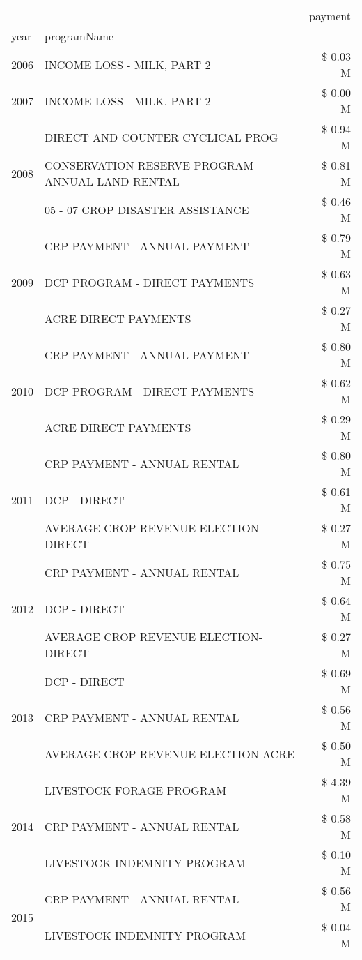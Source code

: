 \begin{tabular}{llr}
\toprule
 &  & payment \\
year & programName &  \\
\midrule
2006 & INCOME LOSS - MILK, PART 2 & \$ 0.03 M \\
\cline{1-3}
2007 & INCOME LOSS - MILK, PART 2 & \$ 0.00 M \\
\cline{1-3}
\multirow[t]{3}{*}{2008} & DIRECT AND COUNTER CYCLICAL PROG & \$ 0.94 M \\
 & CONSERVATION RESERVE PROGRAM - ANNUAL LAND RENTAL & \$ 0.81 M \\
 & 05 - 07 CROP DISASTER ASSISTANCE & \$ 0.46 M \\
\cline{1-3}
\multirow[t]{3}{*}{2009} & CRP PAYMENT - ANNUAL PAYMENT & \$ 0.79 M \\
 & DCP PROGRAM - DIRECT PAYMENTS & \$ 0.63 M \\
 & ACRE DIRECT PAYMENTS & \$ 0.27 M \\
\cline{1-3}
\multirow[t]{3}{*}{2010} & CRP PAYMENT - ANNUAL PAYMENT & \$ 0.80 M \\
 & DCP PROGRAM - DIRECT PAYMENTS & \$ 0.62 M \\
 & ACRE DIRECT PAYMENTS & \$ 0.29 M \\
\cline{1-3}
\multirow[t]{3}{*}{2011} & CRP PAYMENT - ANNUAL RENTAL & \$ 0.80 M \\
 & DCP - DIRECT & \$ 0.61 M \\
 & AVERAGE CROP REVENUE ELECTION-DIRECT & \$ 0.27 M \\
\cline{1-3}
\multirow[t]{3}{*}{2012} & CRP PAYMENT - ANNUAL RENTAL & \$ 0.75 M \\
 & DCP - DIRECT & \$ 0.64 M \\
 & AVERAGE CROP REVENUE ELECTION-DIRECT & \$ 0.27 M \\
\cline{1-3}
\multirow[t]{3}{*}{2013} & DCP - DIRECT & \$ 0.69 M \\
 & CRP PAYMENT - ANNUAL RENTAL & \$ 0.56 M \\
 & AVERAGE CROP REVENUE ELECTION-ACRE & \$ 0.50 M \\
\cline{1-3}
\multirow[t]{3}{*}{2014} & LIVESTOCK FORAGE PROGRAM & \$ 4.39 M \\
 & CRP PAYMENT - ANNUAL RENTAL & \$ 0.58 M \\
 & LIVESTOCK INDEMNITY PROGRAM & \$ 0.10 M \\
\cline{1-3}
\multirow[t]{3}{*}{2015} & CRP PAYMENT - ANNUAL RENTAL & \$ 0.56 M \\
 & LIVESTOCK INDEMNITY PROGRAM & \$ 0.04 M \\

\end{tabular}
